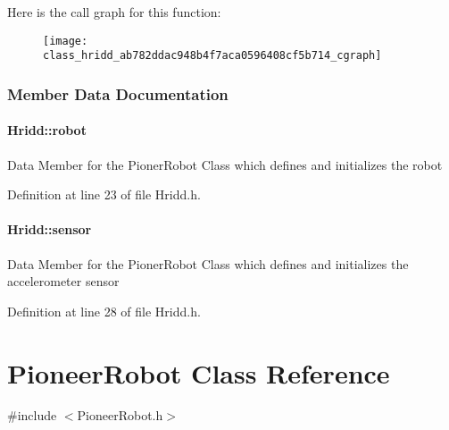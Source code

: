 \begin{appendices}
\-Here is the call graph for this function\-:\nopagebreak
\begin{figure}[H]
\begin{center}
\leavevmode
\texttt{[image: class\_hridd\_ab782ddac948b4f7aca0596408cf5b714\_cgraph]}
\end{center}
\end{figure}




\subsubsection{\-Member \-Data \-Documentation}
\paragraph[{robot}]{ {\bf \-Hridd\-::robot}}\label{class_hridd_a4d70b5a2dc5597c34e05023ffb84935d}
\-Data \-Member for the \-Pioner\-Robot \-Class which defines and initializes the robot 

\-Definition at line 23 of file \-Hridd.\-h.

\paragraph[{sensor}]{ {\bf \-Hridd\-::sensor}}\label{class_hridd_a883c2d9756ee45e1c0be3b2ec359cee8}
\-Data \-Member for the \-Pioner\-Robot \-Class which defines and initializes the accelerometer sensor 

\-Definition at line 28 of file \-Hridd.\-h.




  \section{\-Pioneer\-Robot \-Class \-Reference}


\label{class_pioneer_robot}


{\ttfamily \#include $<$\-Pioneer\-Robot.\-h$>$}


\end{appendices}
